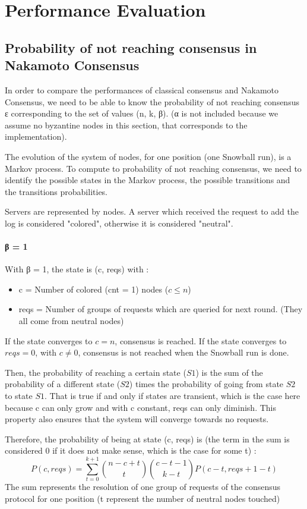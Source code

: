 \documentclass[11pt, twocolumn]{article}
\begin{document}
\section{Performance Evaluation}
\subsection{Probability of not reaching consensus in Nakamoto Consensus}

In order to compare the performances of classical consensus and Nakamoto Consensus, we need to be able to know the probability of not reaching consensus ε corresponding to the set
of values (n, k, β). (α is not included because we assume no byzantine nodes in this section, that corresponds to the implementation).

The evolution of the system of nodes, for one position (one Snowball run), is a Markov process. To compute to probability of not reaching consensus, we need to identify the possible states in the
Markov process, the possible transitions and the transitions probabilities.

Servers are represented by nodes. A server which received the request to add the log is considered "colored", otherwise it is considered "neutral".

\paragraph{β = 1}
With β = 1, the state is (c, reqs) with :
\begin{itemize}
    \item c = Number of colored (cnt = 1) nodes ($c \leq n$)
    \item reqs = Number of groups of requests which are queried for next round. (They all come from neutral nodes)
\end{itemize}
If the state converges to $c = n$, consensus is reached.
If the state converges to $reqs = 0$, with $c \neq 0$, consensus is not reached when the Snowball run is done.

Then, the probability of reaching a certain state ($S1$) is the sum of the probability of a different state ($S2$) times the probability of going from state $S2$ to state $S1$.
That is true if and only if states are transient, which is the case here because c can only grow and with c constant, reqs can only diminish. This property also ensures that the system will converge towards no requests.

Therefore, the probability of being at state (c, reqs) is (the term in the sum is considered 0 if it does not make sense, which is the case for some t) :
\begin{equation*}
    P(c, reqs) = \sum_{t=0}^{k+1} {n-c+t \choose t}{c-t-1 \choose k-t}P(c-t, reqs+1-t)
\end{equation*}
The sum represents the resolution of one group of requests of the consensus protocol for one position (t represent the number of neutral nodes touched)
\end{document}
